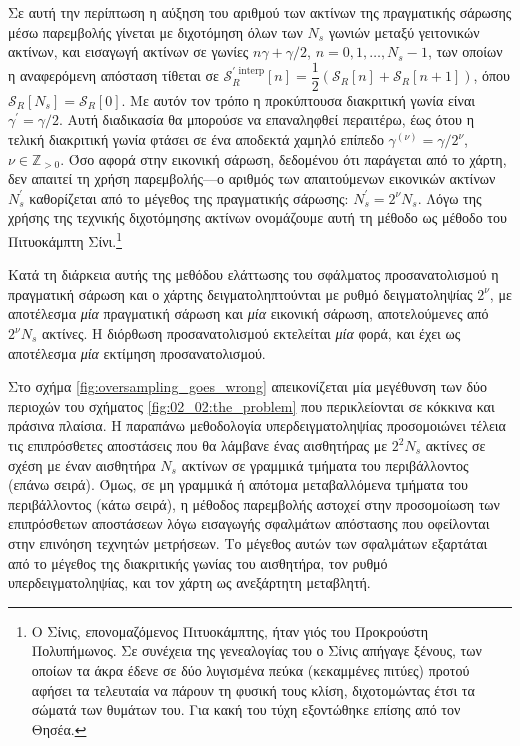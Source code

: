Σε αυτή την περίπτωση η αύξηση του αριθμού των ακτίνων της πραγματικής σάρωσης
μέσω παρεμβολής γίνεται με διχοτόμηση όλων των $N_s$ γωνιών μεταξύ γειτονικών
ακτίνων, και εισαγωγή ακτίνων σε γωνίες
$n\gamma + \gamma/2$, $n = 0,1,\dots,N_s-1$, των οποίων η αναφερόμενη απόσταση
τίθεται σε
$\mathcal{S}_R^{\prime\text{\ interp}}[n] = \dfrac{1}{2}(\mathcal{S}_R[n] + \mathcal{S}_R[n+1])$,
όπου $\mathcal{S}_R[N_s] = \mathcal{S}_R[0]$. Με αυτόν τον τρόπο
η προκύπτουσα διακριτική γωνία είναι $\gamma^\prime = \gamma / 2$. Αυτή
διαδικασία θα μπορούσε να επαναληφθεί περαιτέρω, έως ότου η τελική
διακριτική γωνία φτάσει σε ένα αποδεκτά χαμηλό επίπεδο
$\gamma^{(\nu)} = \gamma / 2^\nu$, $\nu \in \mathbb{Z}_{> 0}$. Όσο αφορά στην
εικονική σάρωση, δεδομένου ότι παράγεται από το χάρτη, δεν απαιτεί τη χρήση
παρεμβολής---ο αριθμός των απαιτούμενων εικονικών ακτίνων $N_s^\prime$
καθορίζεται από το μέγεθος της πραγματικής σάρωσης: $N_s^\prime = 2^\nu N_s$.
Λόγω της χρήσης της τεχνικής διχοτόμησης ακτίνων ονομάζουμε αυτή τη μέθοδο ως
μέθοδο του Πιτυοκάμπτη Σίνι.\footnote{Ο Σίνις, επονομαζόμενος Πιτυοκάμπτης, ήταν
γιός του Προκρούστη Πολυπήμωνος. Σε συνέχεια της γενεαλογίας του ο Σίνις απήγαγε
ξένους, των οποίων τα άκρα έδενε σε δύο λυγισμένα πεύκα (κεκαμμένες πιτύες)
προτού αφήσει τα τελευταία να πάρουν τη φυσική τους κλίση, διχοτομώντας έτσι τα
σώματά των θυμάτων του. Για κακή του τύχη εξοντώθηκε επίσης από τον Θησέα.}

\begin{remark}
  \label{rem:sizes_incorrect}
  Κατά τη διάρκεια αυτής της μεθόδου ελάττωσης του σφάλματος προσανατολισμού η
  πραγματική σάρωση και ο χάρτης δειγματοληπτούνται με ρυθμό δειγματοληψίας
  $2^\nu$, με αποτέλεσμα \textit{μία} πραγματική σάρωση και \textit{μία}
  εικονική σάρωση, αποτελούμενες από $2^\nu N_s$ ακτίνες. Η διόρθωση
  προσανατολισμού εκτελείται \textit{μία} φορά, και έχει ως αποτέλεσμα
  \textit{μία} εκτίμηση προσανατολισμού.
\end{remark}

Στο σχήμα \ref{fig:oversampling_goes_wrong} απεικονίζεται μία μεγέθυνση των δύο
περιοχών του σχήματος \ref{fig:02_02:the_problem} που περικλείονται σε κόκκινα
και πράσινα πλαίσια. Η παραπάνω μεθοδολογία υπερδειγματοληψίας προσομοιώνει
τέλεια τις επιπρόσθετες αποστάσεις που θα λάμβανε ένας αισθητήρας με $2^2 N_s$
ακτίνες σε σχέση με έναν αισθητήρα $N_s$ ακτίνων σε γραμμικά τμήματα του
περιβάλλοντος (επάνω σειρά). Όμως, σε μη γραμμικά ή απότομα μεταβαλλόμενα
τμήματα του περιβάλλοντος (κάτω σειρά), η μέθοδος παρεμβολής αστοχεί στην
προσομοίωση των επιπρόσθετων αποστάσεων λόγω εισαγωγής σφαλμάτων απόστασης που
οφείλονται στην επινόηση τεχνητών μετρήσεων. Το μέγεθος αυτών των σφαλμάτων
εξαρτάται από το μέγεθος της διακριτικής γωνίας του αισθητήρα, τον ρυθμό
υπερδειγματοληψίας, και τον χάρτη ως ανεξάρτητη μεταβλητή.

